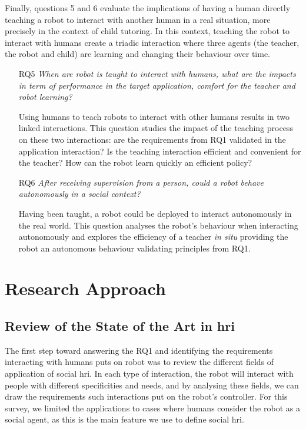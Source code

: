 Finally, questions 5 and 6 evaluate the implications of having a human directly teaching a robot to interact with another human in a real situation, more precisely in the context of child tutoring. In this context, teaching the robot to interact with humans create a triadic interaction where three agents (the teacher, the robot and child) are learning and changing their behaviour over time.

\begin{itemize}
	\item [RQ5] \emph{When are robot is taught to interact with humans, what are the impacts in term of performance in the target application, comfort for the teacher and robot learning?}

		Using humans to teach robots to interact with other humans results in two linked interactions. This question studies the impact of the teaching process on these two interactions: are the requirements from RQ1 validated in the application interaction? Is the teaching interaction efficient and convenient for the teacher? How can the robot learn quickly an efficient policy?
		
    \item [RQ6] \emph{After receiving supervision from a person, could a robot behave autonomously in a social context?}

	 	Having been taught, a robot could be deployed to interact autonomously in the real world. This question analyses the robot's behaviour when interacting autonomously and explores the efficiency of a teacher \textit{in situ} providing the robot an autonomous behaviour validating principles from RQ1.
	 
\end{itemize}

\section{Research Approach}

\subsection{Review of the State of the Art in \gls{hri}}

The first step toward answering the RQ1 and identifying the requirements interacting with humans puts on robot was to review the different fields of application of social \gls{hri}. In each type of interaction, the robot will interact with people with different specificities and needs, and by analysing these fields, we can draw the requirements such interactions put on the robot's controller. For this survey, we limited the applications to cases where humans consider the robot as a social agent, as this is the main feature we use to define social \gls{hri}.

